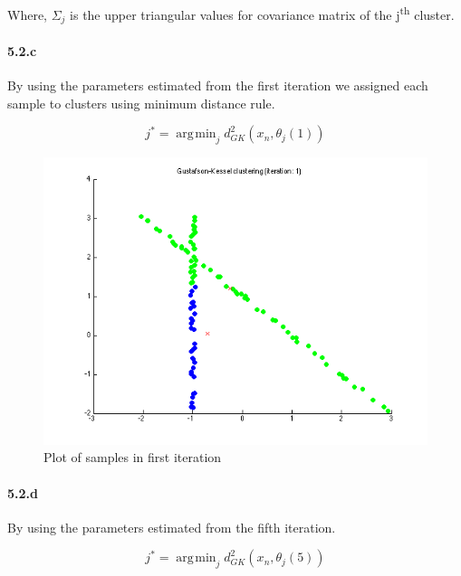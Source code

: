 \documentclass[a4paper]{article}
\DeclareMathOperator*{\argmin}{\arg\!\min}
\begin{document}
	Where, $\Sigma_j$ is the upper triangular values for covariance matrix of the j\textsuperscript{th} cluster.
	
\paragraph{5.2.c} By using the parameters estimated from the first iteration we assigned each sample to clusters using minimum distance rule.

	\begin{equation}
		j^* = \argmin_j d^2_{GK}(x_n, \theta_j(1))
	\end{equation}

	\begin{figure}[H]
		\centering
			\includegraphics[scale=.55]{images/gk_clustering_1.png}
		\caption{Plot of samples in first iteration}
	\end{figure}

\paragraph{5.2.d} By using the parameters estimated from the fifth iteration.

	\begin{equation}
		j^* = \argmin_j d^2_{GK}(x_n, \theta_j(5))
	\end{equation}
\end{document}
